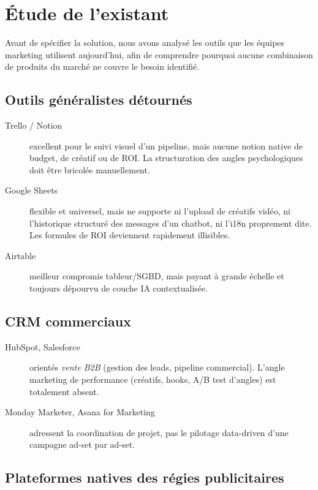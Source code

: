 \section{Étude de l'existant}
\label{sec:existant}

Avant de spécifier la solution, nous avons analysé les outils que les équipes
marketing utilisent aujourd'hui, afin de comprendre pourquoi aucune
combinaison de produits du marché ne couvre le besoin identifié.

\subsection{Outils généralistes détournés}

\begin{description}
    \item[Trello / Notion] excellent pour le suivi visuel d'un pipeline,
    mais aucune notion native de budget, de créatif ou de ROI. La
    structuration des angles psychologiques doit être bricolée manuellement.

    \item[Google Sheets] flexible et universel, mais ne supporte ni
    l'upload de créatifs vidéo, ni l'historique structuré des messages d'un
    chatbot, ni l'i18n proprement dite. Les formules de ROI deviennent
    rapidement illisibles.

    \item[Airtable] meilleur compromis tableur/SGBD, mais payant à grande
    échelle et toujours dépourvu de couche IA contextualisée.
\end{description}

\subsection{CRM commerciaux}

\begin{description}
    \item[HubSpot, Salesforce] orientés \emph{vente B2B} (gestion des
    leads, pipeline commercial). L'angle marketing de performance (créatifs,
    hooks, A/B test d'angles) est totalement absent.

    \item[Monday Marketer, Asana for Marketing] adressent la coordination
    de projet, pas le pilotage data-driven d'une campagne ad-set par
    ad-set.
\end{description}

\subsection{Plateformes natives des régies publicitaires}

